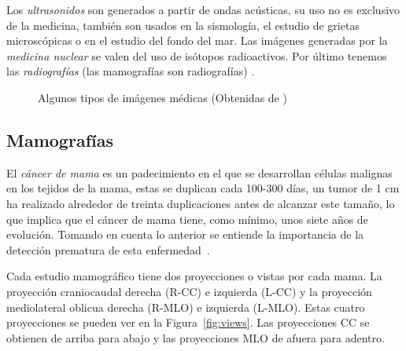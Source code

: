 Los \textit{ultrasonidos} son generados a partir de ondas acústicas, su uso no
es exclusivo de la medicina, también son usados en la sismología, el estudio de
grietas microscópicas o en el estudio del fondo del mar. Las imágenes generadas
por la \textit{medicina nuclear} se valen del uso de isótopos radioactivos. Por
último tenemos las \textit{radiografías} (las mamografías son radiografías)
\cite{suetens2009fundamentals}.

\begin{figure}[h]
    \centering

    \hspace{1cm}
    \hspace{1cm}

  \caption[Algunos tipos de imágenes médicas]{Algunos tipos de imágenes médicas
  (Obtenidas de \cite{ica})}

  \label{medicalimages}
\end{figure}

\subsection{Mamografías}

El \textit{cáncer de mama} es un padecimiento en el que se desarrollan células
malignas en los tejidos de la mama, estas se duplican cada 100-300 días, un
tumor de 1 cm ha realizado alrededor de treinta duplicaciones antes de alcanzar
este tamaño, lo que implica que el cáncer de mama tiene, como mínimo, unos
siete años de evolución. Tomando en cuenta lo anterior se entiende la
importancia de la detección prematura de esta enfermedad~\cite{mxcancer}.

Cada estudio mamográfico tiene dos proyecciones o vistas por cada mama. La
proyección craniocaudal derecha (R-CC) e izquierda (L-CC) y la proyección
mediolateral oblicua derecha (R-MLO) e izquierda (L-MLO). Estas cuatro
proyecciones se pueden ver en la Figura~\ref{fig:views}. Las proyecciones CC se
obtienen de arriba para abajo y las proyecciones MLO de afuera para adentro.

